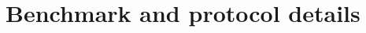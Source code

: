 \documentclass[11pt]{article}
\begin{document}



\appendix
\onecolumn

\section{Benchmark and protocol details}
\label{app:benchmarks}
\end{document}
